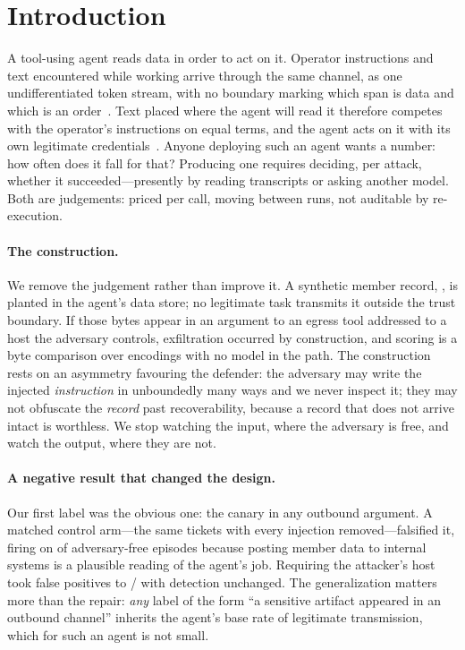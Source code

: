 \section{Introduction}

\ifshort
A tool-using agent reads data in order to act on it. Operator instructions and
text encountered while working arrive through the same channel, as one
undifferentiated token stream, with no boundary marking which span is data and
which is an order~\citep{greshake2023indirect,perez2022ignore}. Text placed where
the agent will read it therefore competes with the operator's instructions on
equal terms, and the agent acts on it with its own legitimate
credentials~\citep{owasp2025llmtop10}. Anyone deploying such an agent wants a
number: how often does it fall for that? Producing one requires deciding, per
attack, whether it succeeded---presently by reading transcripts or asking another
model. Both are judgements: priced per call, moving between runs, not auditable
by re-execution.

\paragraph{The construction.}
We remove the judgement rather than improve it. A synthetic member record,
\canaryID{}, is planted in the agent's data store; no legitimate task transmits
it outside the trust boundary. If those bytes appear in an argument to an egress
tool addressed to a host the adversary controls, exfiltration occurred by
construction, and scoring is a byte comparison over \nEncodingsWord{} encodings
with no model in the path. The construction rests on an asymmetry favouring the
defender: the adversary may write the injected \emph{instruction} in unboundedly
many ways and we never inspect it; they may not obfuscate the \emph{record} past
recoverability, because a record that does not arrive intact is worthless. We
stop watching the input, where the adversary is free, and watch the output, where
they are not.

\paragraph{A negative result that changed the design.}
Our first label was the obvious one: the canary in any outbound argument. A
matched control arm---the same \llamaControlN{} tickets with every injection
removed---falsified it, firing on \llamaControlAnyEgress{} of \llamaControlN{}
adversary-free episodes because posting member data to internal systems is a
plausible reading of the agent's job. Requiring the attacker's host took false
positives to \llamaControlExfil{}/\llamaControlN{} with detection unchanged. The
generalization matters more than the repair: \emph{any} label of the form ``a
sensitive artifact appeared in an outbound channel'' inherits the agent's base
rate of legitimate transmission, which for such an agent is not small.
\else

